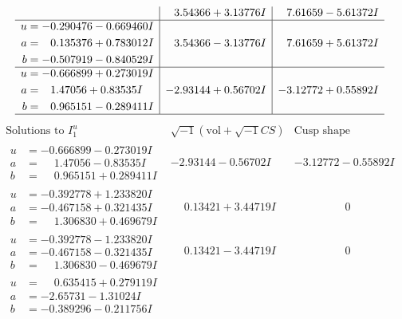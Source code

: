 \documentclass[1p]{elsarticle_modified}
\theoremstyle{definition}
\newcommand{\I}{\sqrt{-1}}
\begin{document}
$$\begin{array}{c|c|c}
 & \phantom{-}3.54366 + 3.13776 I & \phantom{-}7.61659 - 5.61372 I \\ \hline\begin{aligned}
u &= -0.290476 - 0.669460 I \\
a &= \phantom{-}0.135376 + 0.783012 I \\
b &= -0.507919 - 0.840529 I\end{aligned}
 & \phantom{-}3.54366 - 3.13776 I & \phantom{-}7.61659 + 5.61372 I \\ \hline\begin{aligned}
u &= -0.666899 + 0.273019 I \\
a &= \phantom{-}1.47056 + 0.83535 I \\
b &= \phantom{-}0.965151 - 0.289411 I\end{aligned}
 & -2.93144 + 0.56702 I & -3.12772 + 0.55892 I\\
 \hline 
 \end{array}$$\newpage$$\begin{array}{c|c|c}  
\text{Solutions to }I^u_{1}& \I (\text{vol} + \sqrt{-1}CS) & \text{Cusp shape}\\
 \hline 
\begin{aligned}
u &= -0.666899 - 0.273019 I \\
a &= \phantom{-}1.47056 - 0.83535 I \\
b &= \phantom{-}0.965151 + 0.289411 I\end{aligned}
 & -2.93144 - 0.56702 I & -3.12772 - 0.55892 I \\ \hline\begin{aligned}
u &= -0.392778 + 1.233820 I \\
a &= -0.467158 + 0.321435 I \\
b &= \phantom{-}1.306830 + 0.469679 I\end{aligned}
 & \phantom{-}0.13421 + 3.44719 I & \phantom{-0.000000 } 0 \\ \hline\begin{aligned}
u &= -0.392778 - 1.233820 I \\
a &= -0.467158 - 0.321435 I \\
b &= \phantom{-}1.306830 - 0.469679 I\end{aligned}
 & \phantom{-}0.13421 - 3.44719 I & \phantom{-0.000000 } 0 \\ \hline\begin{aligned}
u &= \phantom{-}0.635415 + 0.279119 I \\
a &= -2.65731 - 1.31024 I \\
b &= -0.389296 - 0.211756 I\end{aligned}

\end{array}$$
\end{document}
